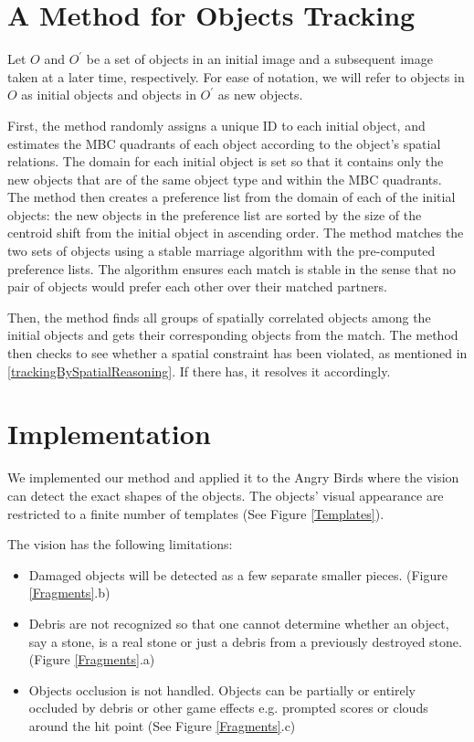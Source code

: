 \documentclass[letterpaper]{article}
\begin{document}
\section{A Method for Objects Tracking}
Let $O$ and $O^{\prime}$ be a set of objects in an initial image and a subsequent image taken at a later time, respectively. For ease of notation, we will refer to objects in $O$ as initial objects and objects in $O^{\prime}$ as new objects.

First, the method randomly assigns a unique ID to each initial object, and estimates the MBC quadrants of each object according to the object's spatial relations. The domain for each initial object is set so that it contains only the new objects that are of the same object type and within the MBC quadrants. The method then creates a preference list from the domain of each of the initial objects: the new objects in the preference list are sorted by the size of the centroid shift from the initial object in ascending order. The method matches the two sets of objects using a stable marriage algorithm with the pre-computed preference lists. The algorithm ensures each match is stable in the sense that no pair of objects would prefer each other over their matched partners. 

Then, the method finds all groups of spatially correlated objects among the initial objects and gets their corresponding objects from the match. The method then checks to see whether a spatial constraint has been violated, as mentioned in \ref{trackingBySpatialReasoning}. If there has, it resolves it accordingly.

 

\section{Implementation}
We implemented our method and applied it to the Angry Birds where the vision can detect the exact shapes of the objects\cite{}. The objects' visual appearance are restricted to a finite number of templates (See Figure \ref{Templates}).

The vision has the following limitations: 
\begin{itemize}
\item Damaged objects will be detected as a few separate smaller pieces. (Figure \ref{Fragments}.b) 
\item Debris are not recognized so that one cannot determine whether an object, say a stone, is a real stone or just a debris from a previously destroyed stone. (Figure \ref{Fragments}.a) 
\item Objects occlusion is not handled. Objects can be partially or entirely occluded by debris or other game effects e.g. prompted scores or clouds around the hit point (See Figure \ref{Fragments}.c)
\end{itemize}
\end{document}
